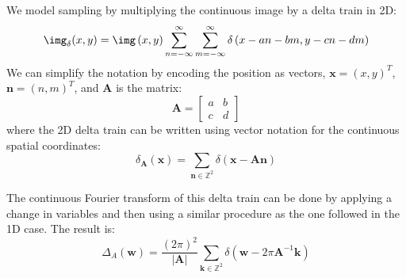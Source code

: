 We model sampling by multiplying the continuous image by a delta train in 2D:
\begin{equation}
\img_{\delta} (x,y) = \img \left( x,y \right) \sum_{n=-\infty}^{\infty} \sum_{m=-\infty}^{\infty} \delta \left( x- an-bm, y - cn-dm \right)
\end{equation}
We can simplify the notation by encoding the position as vectors, $\mathbf{x} = (x,y)^T$,  $\mathbf{n} = (n,m)^T$, and $\mathbf{A}$ is the matrix: 
\begin{equation}
\mathbf{A} = \left[ 
\begin{array}{cc}
a & b\\
c & d
\end{array}
\right]
\end{equation}
where the 2D delta train can be written using vector notation for the continuous spatial coordinates:
\begin{equation}
\delta_{\mathbf{A}}(\mathbf{x}) = \sum_{\mathbf{n} \in \mathbb{Z}^2} \delta \left( \mathbf{x} - \mathbf{A} \mathbf{n} \right)
\end{equation}



The continuous Fourier transform of this delta train can be done by applying a change in variables and then using a similar procedure as the one followed in the 1D case. The result is:
\begin{equation}
\Delta_{A} (\mathbf{w}) = \frac{(2 \pi)^2}{|\mathbf{A}|} \sum_{\mathbf{k} \in \mathbb{Z}^2} \delta \left( \mathbf{w} - 2 \pi \mathbf{A}^{-1} \mathbf{k} \right)
\end{equation}

